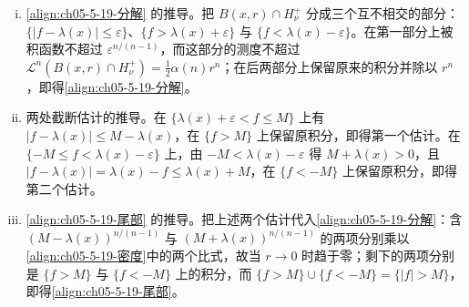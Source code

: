 \documentclass[../../main.tex]{subfiles}%
\begin{document}
\begin{remark}
\begin{enumerate}[(i)]
\begin{align*}
\end{align*}
\item \eqref{align:ch05-5-19-分解} 的推导。把 $B(x,r)\cap H_\nu^+$ 分成三个互不相交的部分：$\{\lvert f-\lambda(x)\rvert\leqslant\varepsilon\}$、$\{f>\lambda(x)+\varepsilon\}$ 与 $\{f<\lambda(x)-\varepsilon\}$。在第一部分上被积函数不超过 $\varepsilon^{n/(n-1)}$，而这部分的测度不超过 $\mathcal{L}^n(B(x,r)\cap H_\nu^+)=\frac12\alpha(n)r^n$；在后两部分上保留原来的积分并除以 $r^n$，即得\eqref{align:ch05-5-19-分解}。
\item 两处截断估计的推导。在 $\{\lambda(x)+\varepsilon<f\leqslant M\}$ 上有 $\lvert f-\lambda(x)\rvert\leqslant M-\lambda(x)$，在 $\{f>M\}$ 上保留原积分，即得第一个估计。在 $\{-M\leqslant f<\lambda(x)-\varepsilon\}$ 上，由 $-M<\lambda(x)-\varepsilon$ 得 $M+\lambda(x)>0$，且 $\lvert f-\lambda(x)\rvert=\lambda(x)-f\leqslant\lambda(x)+M$，在 $\{f<-M\}$ 上保留原积分，即得第二个估计。
\item \eqref{align:ch05-5-19-尾部} 的推导。把上述两个估计代入\eqref{align:ch05-5-19-分解}：含 $(M-\lambda(x))^{n/(n-1)}$ 与 $(M+\lambda(x))^{n/(n-1)}$ 的两项分别乘以\eqref{align:ch05-5-19-密度}中的两个比式，故当 $r\to0$ 时趋于零；剩下的两项分别是 $\{f>M\}$ 与 $\{f<-M\}$ 上的积分，而 $\{f>M\}\cup\{f<-M\}=\{\lvert f\rvert>M\}$，即得\eqref{align:ch05-5-19-尾部}。
\end{enumerate}
\end{remark}
\end{document}

